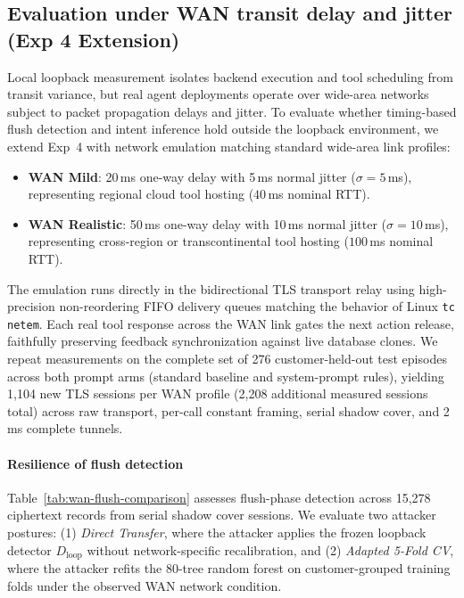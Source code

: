\subsection{Evaluation under WAN transit delay and jitter (Exp 4 Extension)}\label{sec:wan-netem-eval}
Local loopback measurement isolates backend execution and tool scheduling from transit variance, but real agent deployments operate over wide-area networks subject to packet propagation delays and jitter. To evaluate whether timing-based flush detection and intent inference hold outside the loopback environment, we extend Exp~4 with network emulation matching standard wide-area link profiles:
\begin{itemize}
    \item \textbf{WAN Mild}: 20\,ms one-way delay with 5\,ms normal jitter ($\sigma = 5$\,ms), representing regional cloud tool hosting ($40$\,ms nominal RTT).
    \item \textbf{WAN Realistic}: 50\,ms one-way delay with 10\,ms normal jitter ($\sigma = 10$\,ms), representing cross-region or transcontinental tool hosting ($100$\,ms nominal RTT).
\end{itemize}
The emulation runs directly in the bidirectional TLS transport relay using high-precision non-reordering FIFO delivery queues matching the behavior of Linux \texttt{tc netem}. Each real tool response across the WAN link gates the next action release, faithfully preserving feedback synchronization against live database clones. We repeat measurements on the complete set of 276 customer-held-out test episodes across both prompt arms (standard baseline and system-prompt rules), yielding 1,104 new TLS sessions per WAN profile (2,208 additional measured sessions total) across raw transport, per-call constant framing, serial shadow cover, and 2\,ms complete tunnels.

\paragraph{Resilience of flush detection}
Table~\ref{tab:wan-flush-comparison} assesses flush-phase detection across 15,278 ciphertext records from serial shadow cover sessions. We evaluate two attacker postures: (1) \emph{Direct Transfer}, where the attacker applies the frozen loopback detector $D_{\text{loop}}$ without network-specific recalibration, and (2) \emph{Adapted 5-Fold CV}, where the attacker refits the 80-tree random forest on customer-grouped training folds under the observed WAN network condition.

